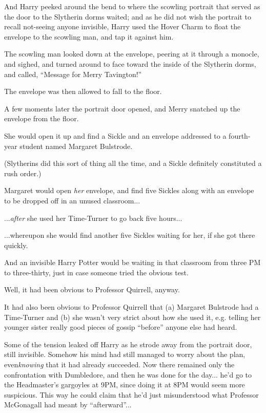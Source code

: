 And Harry peeked around the bend to where the scowling portrait that
served as the door to the Slytherin dorms waited; and as he did not wish
the portrait to recall not-seeing anyone invisible, Harry used the Hover
Charm to float the envelope to the scowling man, and tap it against him.

The scowling man looked down at the envelope, peering at it through a
monocle, and sighed, and turned around to face toward the inside of the
Slytherin dorms, and called, ``Message for Merry Tavington!''

The envelope was then allowed to fall to the floor.

A few moments later the portrait door opened, and Merry snatched up the
envelope from the floor.

She would open it up and find a Sickle and an envelope addressed to a
fourth-year student named Margaret Bulstrode.

(Slytherins did this sort of thing all the time, and a Sickle definitely
constituted a rush order.)

Margaret would open \emph{her} envelope, and find five Sickles along
with an envelope to be dropped off in an unused classroom...

...\emph{after} she used her Time-Turner to go back five
hours...

...whereupon she would find another five Sickles waiting for her,
if she got there quickly.

And an invisible Harry Potter would be waiting in that classroom from
three PM to three-thirty, just in case someone tried the obvious test.

Well, it had been obvious to Professor Quirrell, anyway.

It had also been obvious to Professor Quirrell that (a) Margaret
Bulstrode had a Time-Turner and (b) she wasn't very strict about how she
used it, e.g. telling her younger sister really good pieces of gossip
``before'' anyone else had heard.

Some of the tension leaked off Harry as he strode away from the portrait
door, still invisible. Somehow his mind had still managed to worry about
the plan, even\emph{knowing} that it had already succeeded. Now there
remained only the confrontation with Dumbledore, and then he was done
for the day... he'd go to the Headmaster's gargoyles at 9PM, since
doing it at 8PM would seem more suspicious. This way he could claim that
he'd just misunderstood what Professor McGonagall had meant by
``afterward''...

